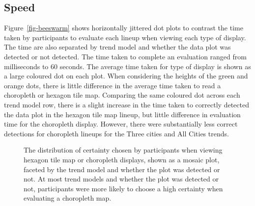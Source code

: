 \documentclass[
doublespace,
  times]{anzsauth}
\begin{document}
\subsection{Speed}\label{speed}

Figure~\ref{fig-beeswarm} shows horizontally jittered dot plots to
contrast the time taken by participants to evaluate each lineup when
viewing each type of display. The time are also separated by trend model
and whether the data plot was detected or not detected. The time taken
to complete an evaluation ranged from milliseconds to 60 seconds. The
average time taken for type of display is shown as a large coloured dot
on each plot. When considering the heights of the green and orange dots,
there is little difference in the average time taken to read a
choropleth or hexagon tile map. Comparing the same coloured dot across
each trend model row, there is a slight increase in the time taken to
correctly detected the data plot in the hexagon tile map lineup, but
little difference in evaluation time for the choropleth display.
However, there were substantially less correct detections for choropleth
lineups for the Three cities and All Cities trends.

\begin{figure}


\caption{\label{fig-certainty}The distribution of certainty chosen by
participants when viewing hexagon tile map or choropleth displays, shown
as a mosaic plot, faceted by the trend model and whether the plot was
detected or not. At most trend models and whether the plot was detected
or not, participants were more likely to choose a high certainty when
evaluating a choropleth map.}

\end{figure}%
\end{document}
